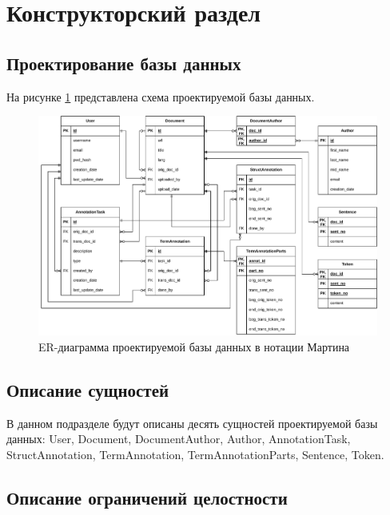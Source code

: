\section{Конструкторский раздел}

\subsection{Проектирование базы данных}

На рисунке \ref{fig:erd} представлена схема проектируемой базы данных.

\begin{figure}[H]
	\centering
	\includegraphics[width=\textwidth]{diag/crow-foot-erd.pdf}
	\caption{ER-диаграмма проектируемой базы данных в нотации Мартина}
	\label{fig:erd}
\end{figure}

\subsection{Описание сущностей}

В данном подразделе будут описаны десять сущностей проектируемой базы данных: User, Document, DocumentAuthor, Author, AnnotationTask, StructAnnotation, TermAnnotation, TermAnnotationParts, Sentence, Token.

\subsection{Описание ограничений целостности}

